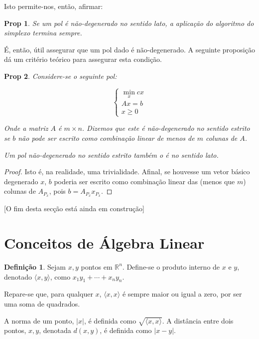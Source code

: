 \documentclass{article}
\newcommand{\R}{\mathbb{R}}
\newtheorem{prop}{Prop}
\theoremstyle{definition}
\newtheorem*{definition*}{Definição}
\begin{document}
	Isto permite-nos, então, afirmar:
	
	\begin{prop}
	Se um pol é não-degenerado no sentido lato, a aplicação do algoritmo do simplexo termina sempre.
	\end{prop}
	
	É, então, útil assegurar que um pol dado é não-degenerado. A seguinte proposição dá um critério teórico para assegurar esta condição.
	
	\begin{prop}
	Considere-se o seguinte pol:
	
	\[
	\begin{cases}
	\min\limits_x cx\\
	Ax = b\\
	x \geq 0
	\end{cases}
	\]
	
	Onde a matriz $A$ é $m \times n$. Dizemos que este é \emph{não-degenerado no sentido estrito} se $b$ não pode ser escrito como combinação linear de menos de $m$ colunas de $A$.
	
	Um pol não-degenerado no sentido estrito também o é no sentido lato.
	\end{prop}
	
	\begin{proof}
	Isto é, na realidade, uma trivialidade. Afinal, se houvesse um vetor básico degenerado $x$, $b$ poderia ser escrito como combinação linear das (menos que $m$) colunas de $A_{P_x}$, pois $b = A_{P_x} x_{P_x}$.
	\end{proof}
	
	[O fim desta secção está ainda em construção]
	
	
	\appendix
	
	\section{Conceitos de Álgebra Linear}
	
	
	\begin{definition*}
	Sejam $x, y$ pontos em $\R^n$. Define-se o produto interno de $x$ e $y$, denotado $\langle x, y \rangle$, como $x_1 y_1 + \cdots + x_n y_n$.
	
	Repare-se que, para qualquer $x$, $\langle x, x \rangle$ é sempre maior ou igual a zero, por ser uma soma de quadrados.
	
	A norma de um ponto, $\lvert x \rvert$, é definida como $\sqrt{\langle x, x \rangle}$. A distância entre dois pontos, $x, y$, denotada $d(x, y)$, é definida como $\lvert x - y \rvert$.
	\end{definition*}
	
\end{document}
